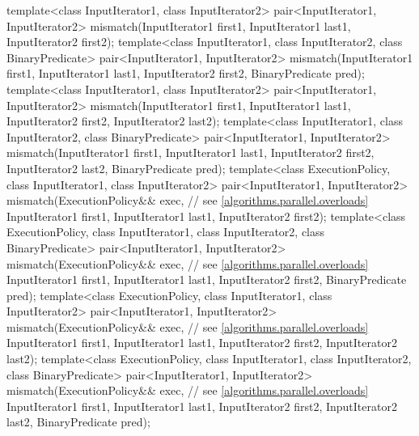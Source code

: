 \begin{codeblock}
{  template<class InputIterator1, class InputIterator2>
    pair<InputIterator1, InputIterator2>
      mismatch(InputIterator1 first1, InputIterator1 last1,
               InputIterator2 first2);
  template<class InputIterator1, class InputIterator2, class BinaryPredicate>
    pair<InputIterator1, InputIterator2>
      mismatch(InputIterator1 first1, InputIterator1 last1,
               InputIterator2 first2, BinaryPredicate pred);
  template<class InputIterator1, class InputIterator2>
    pair<InputIterator1, InputIterator2>
      mismatch(InputIterator1 first1, InputIterator1 last1,
               InputIterator2 first2, InputIterator2 last2);
  template<class InputIterator1, class InputIterator2, class BinaryPredicate>
    pair<InputIterator1, InputIterator2>
      mismatch(InputIterator1 first1, InputIterator1 last1,
               InputIterator2 first2, InputIterator2 last2,
               BinaryPredicate pred);
  template<class ExecutionPolicy, class InputIterator1, class InputIterator2>
    pair<InputIterator1, InputIterator2>
      mismatch(ExecutionPolicy&& exec, // see \ref{algorithms.parallel.overloads}
               InputIterator1 first1, InputIterator1 last1,
               InputIterator2 first2);
  template<class ExecutionPolicy, class InputIterator1, class InputIterator2,
           class BinaryPredicate>
    pair<InputIterator1, InputIterator2>
      mismatch(ExecutionPolicy&& exec, // see \ref{algorithms.parallel.overloads}
               InputIterator1 first1, InputIterator1 last1,
               InputIterator2 first2, BinaryPredicate pred);
  template<class ExecutionPolicy, class InputIterator1, class InputIterator2>
    pair<InputIterator1, InputIterator2>
      mismatch(ExecutionPolicy&& exec, // see \ref{algorithms.parallel.overloads}
               InputIterator1 first1, InputIterator1 last1,
               InputIterator2 first2, InputIterator2 last2);
  template<class ExecutionPolicy, class InputIterator1, class InputIterator2,
           class BinaryPredicate>
    pair<InputIterator1, InputIterator2>
      mismatch(ExecutionPolicy&& exec, // see \ref{algorithms.parallel.overloads}
               InputIterator1 first1, InputIterator1 last1,
               InputIterator2 first2, InputIterator2 last2,
               BinaryPredicate pred);

}
\end{codeblock}
